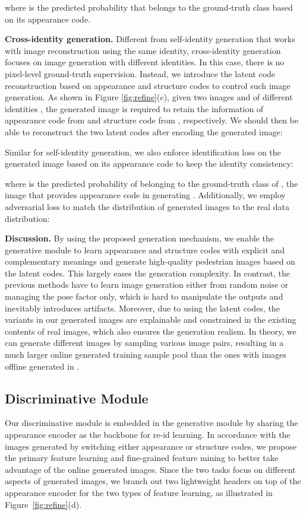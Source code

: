 \documentclass[10pt,twocolumn,letterpaper]{article}
\begin{document}
where  is the predicted probability that  belongs to the ground-truth class  based on its appearance code.


\textbf{Cross-identity generation.} 
Different from self-identity generation that works with image reconstruction using the same identity, cross-identity generation focuses on image generation with different identities. In this case, there is no pixel-level ground-truth supervision. Instead, we introduce the latent code reconstruction based on appearance and structure codes to control such image generation. As shown in Figure \ref{fig:refine}(c), given two images  and  of different identities , the generated image  is required to retain the information of appearance code  from  and structure code  from , respectively. We should then be able to reconstruct the two latent codes after encoding the generated image:
 
Similar for self-identity generation, we also enforce identification loss on the generated image based on its appearance code to keep the identity consistency: 

where  is the predicted probability of  belonging to the ground-truth class  of , the image that provides appearance code in generating . Additionally, we employ adversarial loss to match the distribution of generated images to the real data distribution:


\textbf{Discussion.} 
By using the proposed generation mechanism, we enable the generative module to learn appearance and structure codes with explicit and complementary meanings and generate high-quality pedestrian images based on the latent codes. This largely eases the generation complexity. In contrast, the previous methods \cite{zheng2017unlabeled, huang2018multi, qian2017pose, ge2018fdgan, liu2018pose} have to learn image generation either from random noise or managing the pose factor only,  
which is hard to manipulate the outputs and inevitably introduces artifacts. Moreover, due to using the latent codes, the variants in our generated images are explainable and constrained in the existing contents of real images, which also ensures the generation realism. In theory, we can generate  different images by sampling various image pairs, resulting in a much larger online generated training sample pool than the ones with  images offline generated in \cite{zheng2017unlabeled, huang2018multi, qian2017pose}. 


\subsection{Discriminative Module}
\label{sec:PersonReID}
Our discriminative module is embedded in the generative module by sharing the appearance encoder as the backbone for re-id learning. In accordance with the images generated by switching either appearance or structure codes, we propose the primary feature learning and fine-grained feature mining to better take advantage of the online generated images. Since the two tasks focus on different aspects of generated images, we branch out two lightweight headers on top of the appearance encoder for the two types of feature learning, as illustrated in Figure~\ref{fig:refine}(d). 
\end{document}
